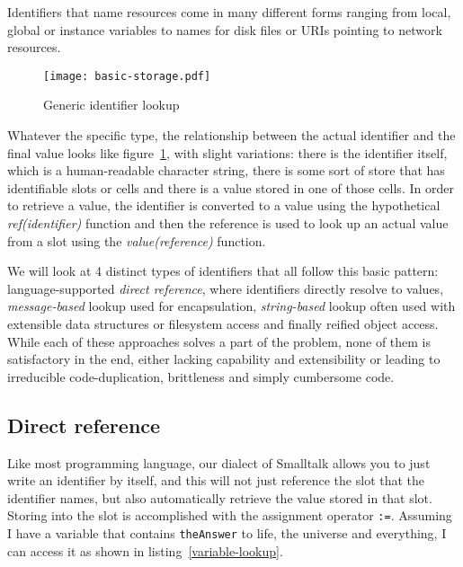 \documentclass[preprint,authoryear]{acm_proc_article-sp}
\begin{document}
Identifiers that name resources come in many different forms ranging from local,
global or instance variables to names for disk files or URIs pointing to network resources.

\begin{figure}[htbp]
\label{identifier-eval}
\begin{center}
\texttt{[image: basic-storage.pdf]}
\caption{Generic identifier lookup}
\end{center}
\end{figure}

Whatever the specific type, the relationship between the actual identifier and the
final value looks like figure~\ref{identifier-eval}, with slight variations:   there is
the identifier itself, which is a human-readable character string, there is some sort
of store that has identifiable slots or cells and there is a value stored in one of those
cells.   In order to retrieve a value, the identifier is converted to a value using the
hypothetical {\em ref(identifier)} function and then the reference is used to look up an actual
value from a slot using the {\em value(reference)} function.


We will look at 4 distinct types of identifiers that all follow this basic pattern:  language-supported 
{\em direct reference}, where identifiers directly resolve to values, {\em message-based} lookup
used for encapsulation,
{\em string-based} lookup often used with extensible data structures or filesystem access and
finally reified object access.   While each of these approaches solves a part of the problem,
none of them is satisfactory in the end, either lacking capability and extensibility or leading to
irreducible code-duplication, brittleness and simply cumbersome code.

\subsection{Direct reference}
\label{direct-reference}
Like most programming language, our dialect of Smalltalk\cite{Goldberg1983} allows you to just write 
an identifier by itself, and this will not just reference the slot that the identifier names, but also
automatically retrieve the value stored in that slot.  Storing into the slot is accomplished with
the assignment operator {\tt :=}.    Assuming I have a variable that contains {\tt theAnswer} to 
life, the universe and everything, I can access it as shown in listing~\ref{variable-lookup}.
\end{document}
